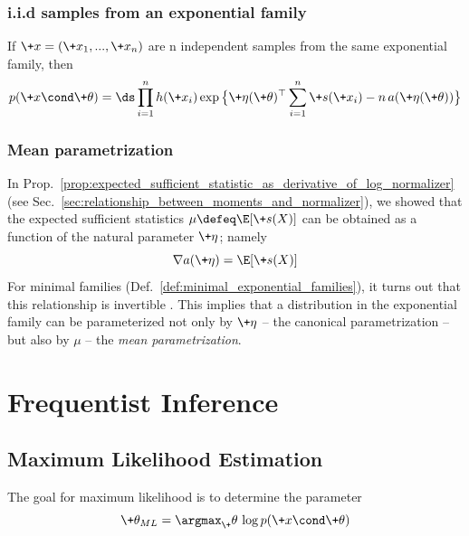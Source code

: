 \documentclass{article} %
\newcommand{\obs}{\+x}
\newcommand{\logNormalizerFunction}{a}
\newcommand{\sufficientStatsFunction}{\+s}
\newcommand{\carrierDensity}{h}
\newcommand{\meanParameter}{\mu}
\newcommand{\param}{\+\theta}
\newcommand{\naturalParam}{\+\eta}
\begin{document}
\subsubsection{i.i.d samples from an exponential family} \label{sec:iid_samples_from_an_exponential_family}
If $\obs=(\obs_1, ..., \obs_n)$ are n independent samples from the same exponential family, then 
\begin{align}
\label{eqn:exponential_family_iid}
 p(\obs \cond \param) = \ds\prod_{i=1}^n \carrierDensity(\obs_i) \exp \big\{ \naturalParam(\param)^\top \sum_{i=1}^n \sufficientStatsFunction(\obs_i) - n \,\logNormalizerFunction(\naturalParam(\param))\big\} 
 \end{align}


\subsubsection{Mean parametrization} \label{sec:mean_parametrization}

In Prop.~\ref{prop:expected_sufficient_statistic_as_derivative_of_log_normalizer} (see Sec.~\ref{sec:relationship_between_moments_and_normalizer}), we showed that the expected sufficient statistics $\meanParameter \defeq \E[\sufficientStatsFunction(X)]$ can be obtained as a function of the natural parameter $\naturalParam$; namely
%
\[ \nabla \logNormalizerFunction(\naturalParam) = \E[\sufficientStatsFunction(X)] \]
%
For minimal families (Def.~\ref{def:minimal_exponential_families}), it turns out that this relationship is invertible \cite[Sec.~8.4]{jordan2010exponential}.   This implies that a distribution in the exponential family can be parameterized not only by $\naturalParam$ -- the canonical parametrization -- but also by $\meanParameter$ -- the \textit{mean parametrization}.   



\section{Frequentist Inference}

\subsection{Maximum Likelihood Estimation}
\label{sec:ml_with_ef}


The goal for maximum likelihood is to determine the parameter
\begin{equation}
\label{eqn:ml}
\param_{ML} = \argmax_\param  \, \log p(\+x \cond \param) 
\end{equation}
\end{document}
